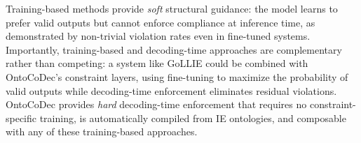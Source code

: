 Training-based methods provide \emph{soft} structural guidance: the model learns to prefer valid outputs but cannot enforce compliance at inference time, as demonstrated by non-trivial violation rates even in fine-tuned systems.
Importantly, training-based and decoding-time approaches are complementary rather than competing: a system like GoLLIE could be combined with OntoCoDec's constraint layers, using fine-tuning to maximize the probability of valid outputs while decoding-time enforcement eliminates residual violations.
OntoCoDec provides \emph{hard} decoding-time enforcement that requires no constraint-specific training, is automatically compiled from IE ontologies, and composable with any of these training-based approaches.

